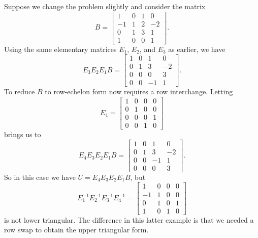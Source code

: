 Suppose we change the problem slightly and consider the matrix
\[B = \left[ \begin{array}{rccr} 1&0&1&0\\-1&1&2&-2 \\0&1&3&1\\1&0&0&1\end{array}  \right].\]
Using the same elementary matrices $E_1$, $E_2$, and $E_3$ as earlier, we have
\[E_3E_2E_1B = \left[ \begin{array}{ccrr} 1&0&1&0\\0&1&3&-2 \\0&0&0&3\\0&0&-1&1\end{array}  \right].\]
To reduce $B$ to row-echelon form now requires a row interchange. Letting
\[E_4 = \left[ \begin{array}{crcc} 1&0&0&0\\0&1&0&0 \\0&0&0&1\\0&0&1&0\end{array}  \right]\]
brings us to
\[E_4E_3E_2E_1B = \left[ \begin{array}{ccrr} 1&0&1&0\\0&1&3&-2 \\0&0&-1&1\\0&0&0&3\end{array}  \right].\]
So in this case we have $U = E_4E_3E_2E_1B$, but
\[E_1^{-1}E_2^{-1}E_3^{-1}E_4^{-1} = \left[ \begin{array}{rccc} 1&0&0&0\\-1&1&0&0 \\0&1&0&1\\1&0&1&0\end{array}  \right]\]
is not lower triangular. The difference in this latter example is that we needed a row swap to obtain the upper triangular form. 


\ExampleIntro

